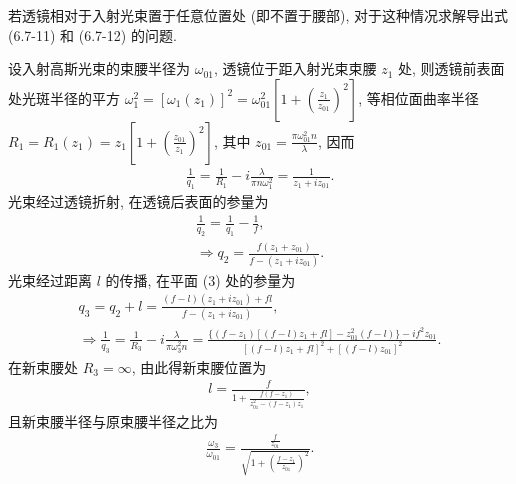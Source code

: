 \documentclass[twoside]{note}
\begin{document}
\begin{exe}
    若透镜相对于入射光束置于任意位置处 (即不置于腰部), 对于这种情况求解导出式 (6.7-11) 和 (6.7-12) 的问题.
\end{exe}
\begin{pf}
    设入射高斯光束的束腰半径为 $\omega_{01}$, 透镜位于距入射光束束腰 $z_1$ 处, 则透镜前表面处光斑半径的平方 $\omega_1^2=[\omega_1(z_1)]^2=\omega_{01}^2\left[1+\left(\frac{z_1}{z_{01}}\right)^2\right]$, 等相位面曲率半径 $R_1=R_1(z_1)=z_1\left[1+\left(\frac{z_{01}}{z_1}\right)^2\right]$, 其中 $z_{01}=\frac{\pi\omega_{01}^2n}{\lambda}$, 因而
    \begin{align}
        \frac{1}{q_1}=\frac{1}{R_1}-i\frac{\lambda}{\pi n\omega_1^2}=\frac{1}{z_1+iz_{01}}.
    \end{align}
    光束经过透镜折射, 在透镜后表面的参量为
    \begin{gather}
        \frac{1}{q_2}=\frac{1}{q_1}-\frac{1}{f},\\
        \Longrightarrow q_2=\frac{f(z_1+z_{01})}{f-(z_1+iz_{01})}.
    \end{gather}
    光束经过距离 $l$ 的传播, 在平面 (3) 处的参量为
    \begin{gather}
        q_3=q_2+l=\frac{(f-l)(z_1+iz_{01})+fl}{f-(z_1+iz_{01})},\\
        \Longrightarrow\frac{1}{q_3}=\frac{1}{R_3}-i\frac{\lambda}{\pi\omega_3^2n}=\frac{\{(f-z_1)[(f-l)z_1+fl]-z_{01}^2(f-l)\}-if^2z_{01}}{[(f-l)z_1+fl]^2+[(f-l)z_{01}]^2}.
    \end{gather}
    在新束腰处 $R_3=\infty$, 由此得新束腰位置为
    \begin{align}
        l=\frac{f}{1+\frac{f(f-z_1)}{z_{01}^2-(f-z_1)z_1}},
    \end{align}
    且新束腰半径与原束腰半径之比为
    \begin{align}
        \frac{\omega_3}{\omega_{01}}=\frac{\frac{f}{z_{01}}}{\sqrt{1+\left(\frac{f-z_1}{z_{01}}\right)^2}}.
    \end{align}
\end{pf}
\end{document}
